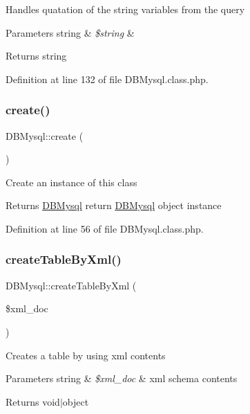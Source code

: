 Handles quatation of the string variables from the query 
\begin{DoxyParams}[1]{Parameters}
string & {\em \$string} & \\
\hline
\end{DoxyParams}
\begin{DoxyReturn}{Returns}
string 
\end{DoxyReturn}


Definition at line 132 of file D\+B\+Mysql.\+class.\+php.

\hypertarget{classDBMysql_a58ab5c56561966d486ba54129aed954d}{}\label{classDBMysql_a58ab5c56561966d486ba54129aed954d} 
\subsubsection{\texorpdfstring{create()}{create()}}
{\footnotesize\ttfamily D\+B\+Mysql\+::create (\begin{DoxyParamCaption}{ }\end{DoxyParamCaption})}

Create an instance of this class \begin{DoxyReturn}{Returns}
\hyperlink{classDBMysql}{D\+B\+Mysql} return \hyperlink{classDBMysql}{D\+B\+Mysql} object instance 
\end{DoxyReturn}


Definition at line 56 of file D\+B\+Mysql.\+class.\+php.

\hypertarget{classDBMysql_a8d5c199f2a7362b92c7a6ba03ebdd554}{}\label{classDBMysql_a8d5c199f2a7362b92c7a6ba03ebdd554} 
\subsubsection{\texorpdfstring{create\+Table\+By\+Xml()}{createTableByXml()}}
{\footnotesize\ttfamily D\+B\+Mysql\+::create\+Table\+By\+Xml (\begin{DoxyParamCaption}\item[{}]{\$xml\+\_\+doc }\end{DoxyParamCaption})}

Creates a table by using xml contents 
\begin{DoxyParams}[1]{Parameters}
string & {\em \$xml\+\_\+doc} & xml schema contents \\
\hline
\end{DoxyParams}
\begin{DoxyReturn}{Returns}
void$\vert$object 
\end{DoxyReturn}


